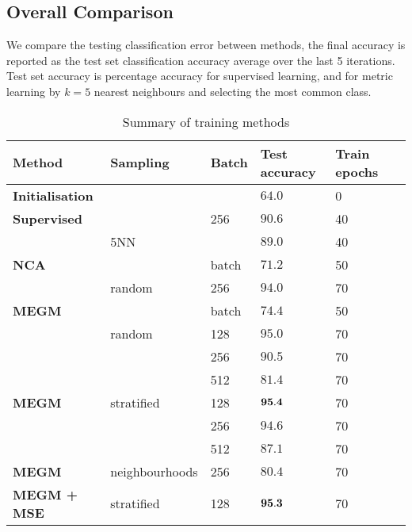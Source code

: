 \subsection{Overall Comparison}

We compare the testing classification error between methods, the final accuracy
is reported as the test set classification accuracy average over the last 5 iterations.
Test set accuracy is percentage accuracy for supervised learning, and for metric
learning by $k = 5$ nearest neighbours and selecting the most common class.




\begin{table*}[ht]

\centering
  \caption{Summary of training methods}

  \begin{tabular}{  l l  l  l l l }
  
    \toprule
    Method &  Sampling & Batch  & Test accuracy &  Train epochs \\  \hline
    \bf{Initialisation} & &  &  $ 64.0  $ & 0  &  \\  
    \hline
    
    \bf{Supervised} & & 256 &  $ 90.6  $ & 40  &  \\  
     & 5NN  &  &  $ 89.0  $ & 40 &  \\  
     \hline
    
    \bf{NCA} &  & batch &  $  71.2  $ &  50  & \\
     & random & 256 & $  94.0  $ & 70 & \\
    
    \hline
    
    \bf{MEGM} &  & batch  &  $  74.4  $ &  50  & \\
     & random & 128 &  $  95.0  $ &  70  & \\     
     &  & 256 & $  90.5  $ &  70 & \\  
     &  & 512 & $  81.4  $ &  70 & \\
    
    \hline
    \bf{MEGM} & stratified & 128 & $  {\bf 95.4 }  $ & 70 & \\  
    
     &  & 256 & $  94.6  $ & 70 & \\  
     &  & 512 & $  87.1  $ & 70 & \\  

     \hline
     
    \bf{MEGM} & neighbourhoods & 256 & $  80.4  $ & 70  & \\
    
    \hline
    
    \bf{MEGM + MSE} & stratified & 128 & $  {\bf 95.3 }  $ & 70  & \\

      \bottomrule
    
    \end{tabular}
\label{fig:metric_summary}
\end{table*}



